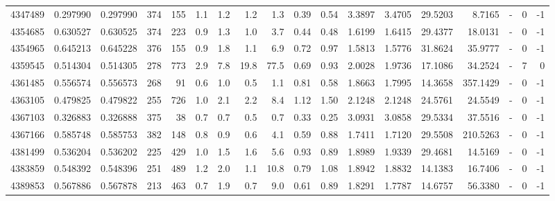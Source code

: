 \begin{tabular}{rrrrrrrrrrrrrrrlrr}
   4347489 & 0.297990 &   0.297990 &  374 &  155 &      1.1 &      1.2 &     1.2 &      1.3 &       0.39 &        0.54 &  3.3897 &  3.4705 &   29.5203 &    8.7165 &             - &        0 &         -1 \\
   4354685 & 0.630527 &   0.630525 &  374 &  223 &      0.9 &      1.3 &     1.0 &      3.7 &       0.44 &        0.48 &  1.6199 &  1.6415 &   29.4377 &   18.0131 &             - &        0 &         -1 \\
   4354965 & 0.645213 &   0.645228 &  376 &  155 &      0.9 &      1.8 &     1.1 &      6.9 &       0.72 &        0.97 &  1.5813 &  1.5776 &   31.8624 &   35.9777 &             - &        0 &         -1 \\
   4359545 & 0.514304 &   0.514305 &  278 &  773 &      2.9 &      7.8 &    19.8 &     77.5 &       0.69 &        0.93 &  2.0028 &  1.9736 &   17.1086 &   34.2524 &             - &        7 &          0 \\
   4361485 & 0.556574 &   0.556573 &  268 &   91 &      0.6 &      1.0 &     0.5 &      1.1 &       0.81 &        0.58 &  1.8663 &  1.7995 &   14.3658 &  357.1429 &             - &        0 &         -1 \\
   4363105 & 0.479825 &   0.479822 &  255 &  726 &      1.0 &      2.1 &     2.2 &      8.4 &       1.12 &        1.50 &  2.1248 &  2.1248 &   24.5761 &   24.5549 &             - &        0 &         -1 \\
   4367103 & 0.326883 &   0.326888 &  375 &   38 &      0.7 &      0.7 &     0.5 &      0.7 &       0.33 &        0.25 &  3.0931 &  3.0858 &   29.5334 &   37.5516 &             - &        0 &         -1 \\
   4367166 & 0.585748 &   0.585753 &  382 &  148 &      0.8 &      0.9 &     0.6 &      4.1 &       0.59 &        0.88 &  1.7411 &  1.7120 &   29.5508 &  210.5263 &             - &        0 &         -1 \\
   4381499 & 0.536204 &   0.536202 &  225 &  429 &      1.0 &      1.5 &     1.6 &      5.6 &       0.93 &        0.89 &  1.8989 &  1.9339 &   29.4681 &   14.5169 &             - &        0 &         -1 \\
   4383859 & 0.548392 &   0.548396 &  251 &  489 &      1.2 &      2.0 &     1.1 &     10.8 &       0.79 &        1.08 &  1.8942 &  1.8832 &   14.1383 &   16.7406 &             - &        0 &         -1 \\
   4389853 & 0.567886 &   0.567878 &  213 &  463 &      0.7 &      1.9 &     0.7 &      9.0 &       0.61 &        0.89 &  1.8291 &  1.7787 &   14.6757 &   56.3380 &             - &        0 &         -1 \\

\end{tabular}
